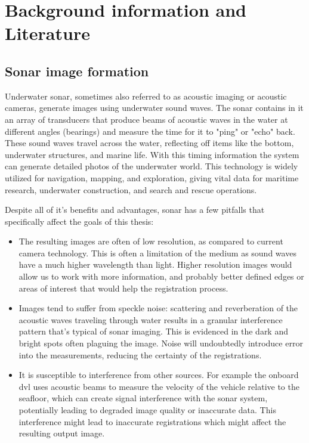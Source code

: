 \chapter{Background information and Literature}
\label{chap:background}

\section{Sonar image formation}

Underwater \acrfull{sonar}, sometimes also referred to as acoustic imaging or acoustic cameras, generate images using underwater sound waves. The \acrshort{sonar} contains in it an array of transducers that produce beams of acoustic waves in the water at different angles (bearings) and measure the time for it to "ping" or "echo" back. These sound waves travel across the water, reflecting off items like the bottom, underwater structures, and marine life. With this timing information the system can generate detailed photos of the underwater world. This technology is widely utilized for navigation, mapping, and exploration, giving vital data for maritime research, underwater construction, and search and rescue operations.

Despite all of it's benefits and advantages, \acrshort{sonar} has a few pitfalls that specifically affect the goals of this thesis: 
\begin{itemize}
    \item The resulting images are often of low resolution, as compared to current camera technology. This is often a limitation of the medium as sound waves have a much higher wavelength than light. Higher resolution images would allow us to work with more information, and probably better defined edges or areas of interest that would help the registration process.
    \item Images tend to suffer from speckle noise: scattering and reverberation of the acoustic waves traveling through water results in a granular interference pattern that's typical of \acrshort{sonar} imaging. This is evidenced in the dark and bright spots often plaguing the image. Noise will undoubtedly introduce error into the measurements, reducing the certainty of the registrations. 
    \item It is susceptible to interference from other sources. For example the onboard \acrshort{dvl} uses acoustic beams to measure the velocity of the vehicle relative to the seafloor, which can create signal interference with the sonar system, potentially leading to degraded image quality or inaccurate data. This interference might lead to inaccurate registrations which might affect the resulting output image.
\end{itemize}


